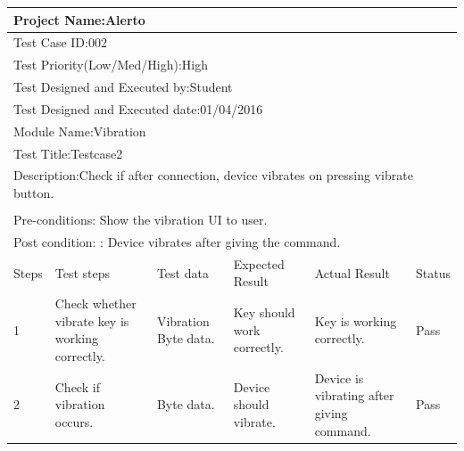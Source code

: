 \documentclass[12pt,a4paper]{report}
\begin{document}
\begin{table}[!h]
	
	\begin{tabular}{|p{0.8cm}|p{2.5cm}|p{3cm}|p{3cm}|p{3cm}|p{2.2cm}|}
		\hline
		\multicolumn{6}{|l|}{Project Name:Alerto}\\
		\hline
		\multicolumn{6}{|l|}{Test Case ID:002}\\
		\hline
		\multicolumn{6}{|l|}{Test Priority(Low/Med/High):High} \\ 
		\hline
		\multicolumn{6}{|l|}{Test Designed and Executed by:Student}\\
		\hline
		\multicolumn{6}{|l|}{Test Designed and Executed date:01/04/2016}\\
		\hline
		\multicolumn{6}{|l|}{Module Name:Vibration} \\ 
		\hline
		\multicolumn{6}{|l|}{Test Title:Testcase2} \\
		\hline
		\multicolumn{6}{|l|}{Description:Check if after connection, device vibrates on pressing vibrate button.}\\
		\hline
		\\
		\hline
		\multicolumn{6}{|l|}{Pre-conditions: Show the vibration UI to user.}\\
		\hline
		\multicolumn{6}{|l|}{Post condition: : Device vibrates after giving the command.}\\
		\hline
		Steps & Test steps & Test data & Expected Result & Actual Result & Status \\ 
		\hline
		1	& Check whether vibrate key is working correctly.	& Vibration Byte data.&	Key should work correctly.	& Key is working correctly.& Pass\\
		\hline
		2	& Check if vibration occurs.	& Byte data.&	Device should vibrate.&	Device is vibrating after giving command.&	Pass\\
		\hline
	\end{tabular}
\end{table}
\end{document}
